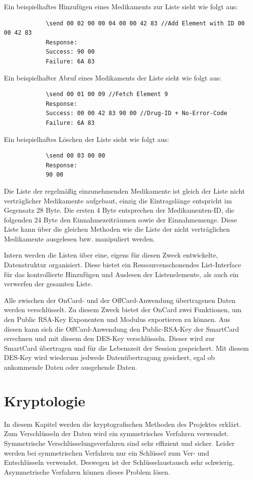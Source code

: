 \documentclass[parskip]{scrartcl}
\begin{document}
		Ein beispielhaftes Hinzufügen eines Medikaments zur Liste sieht wie folgt aus:
		
		\begin{lstlisting}
			\send 00 02 00 00 04 00 00 42 83 //Add Element with ID 00 00 42 83
			Response:
			Success: 90 00
			Failure: 6A 83
		\end{lstlisting}
		
		Ein beispielhafter Abruf eines Medikaments der Liste sieht wie folgt aus:
		
		\begin{lstlisting}
			\send 00 01 00 09 //Fetch Element 9
			Response:
			Success: 00 00 42 83 90 00 //Drug-ID + No-Error-Code
			Failure: 6A 83
		\end{lstlisting}
		
		Ein beispielhaftes Löschen der Liste sieht wie folgt aus:
			
		\begin{lstlisting}
			\send 00 03 00 00
			Response:
			90 00
		\end{lstlisting}
		
		Die Liste der regelmäßig einzunehmenden Medikamente ist gleich der Liste nicht verträg\-licher Medikamente aufgebaut, einzig die Eintragslänge entspricht im Gegensatz 28 Byte. Die ersten 4 Byte entsprechen der Medikamenten-ID, die folgenden 24 Byte den Einnahmezeiträumen sowie der Einnahmemenge. Diese Liste kann über die gleichen Methoden wie die Liste der nicht verträglichen Medikamente ausgelesen bzw. manipuliert werden.
		
		Intern werden die Listen über eine, eigens für diesen Zweck entwickelte, Datenstruktur organisiert. Diese bietet ein Ressourcenschonendes List-Interface für das kontrollierte Hinzufügen und Auslesen der Listenelemente, als auch ein verwerfen der gesamten Liste.
		
		Alle zwischen der OnCard- und der OffCard-Anwendung übertragenen Daten werden verschlüsselt. Zu diesem Zweck bietet der OnCard zwei Funktionen, um den Public RSA-Key Exponenten und Modulus exportieren zu können. Aus diesen kann sich die OffCard-Anwendung den Public-RSA-Key der SmartCard errechnen und mit diesem den DES-Key verschlüsseln. Dieser wird zur SmartCard übertragen und für die Lebenszeit der Session gespeichert. Mit diesem DES-Key wird wiederum jedwede Datenübertragung gesichert, egal ob ankommende Daten oder ausgehende Daten.
	\section{Kryptologie}
		In diesem Kapitel werden die kryptografischen Methoden des Projektes erklärt. Zum Verschlüsseln der Daten wird ein symmetrisches Verfahren verwendet. Symmetrische Verschlüsselungsverfahren sind sehr effizient und sicher. Leider werden bei symmet\-rischen Verfahren nur ein Schlüssel zum Ver- und Entschlüsseln verwendet. Deswegen ist der Schlüsselaustausch sehr schwierig. Asymmetrische Verfahren können dieses Problem lösen.
\end{document}
